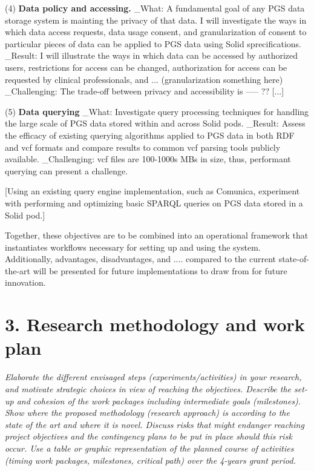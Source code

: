 \documentclass[11pt]{article}
\begin{document}
(4) \textbf{Data policy and accessing.} 
_What: A fundamental goal of any PGS data storage system is mainting the privacy of that data. 
I will investigate the ways in which data access requests, data usage consent, and granularization of consent to particular pieces of data can be applied to PGS data using Solid sprecifications.
_Result: I will illustrate the ways in which data can be accessed by authorized users, restrictions for access can be changed, authorization for access can be requested by clinical professionals, and ... (granularization something here)
_Challenging: The trade-off between privacy and accessibility is ----- ??
[...]

(5) \textbf{Data querying}
_What: Investigate query processing techniques for handling the large scale of PGS data stored within and across Solid pods. 
_Result: Assess the efficacy of existing querying algorithms applied to PGS data in both RDF and vcf formats and compare results to common vcf parsing tools publicly available.
_Challenging: vcf files are 100-1000s MBs in size, thus, performant querying can present a challenge.

[Using an existing query engine implementation, such as Comunica, experiment with performing and optimizing basic SPARQL queries on PGS data stored in a Solid pod.]

Together, these objectives are to be combined into an operational framework that instantiates workflows necessary for setting up and using the system. 
Additionally, advantages, disadvantages, and .... compared to the current state-of-the-art will be presented for future implementations to draw from for future innovation.






\section{3. Research methodology and work plan}
\textit{Elaborate the different envisaged steps (experiments/activities) in your research, and motivate strategic choices in view of reaching the objectives. Describe the set-up and cohesion of the work packages including intermediate goals (milestones).
Show where the proposed methodology (research approach) is according to the state of the art and where it is novel. Discuss risks that might endanger reaching project objectives and the contingency plans to be put in place should this risk occur.
Use a table or graphic representation of the planned course of activities (timing work packages, milestones, critical path) over the 4-years grant period.}
\end{document}
